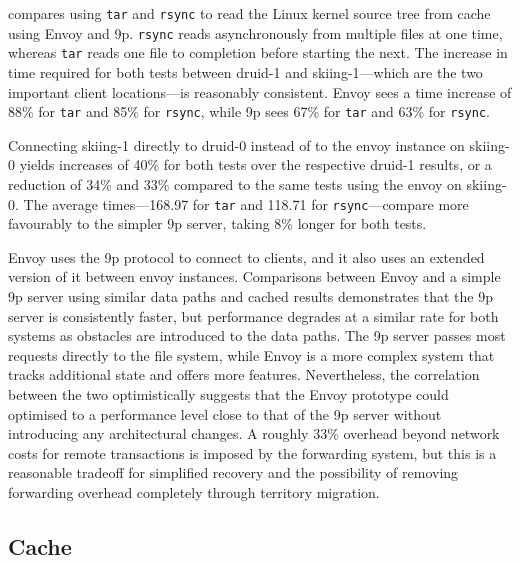  compares using \texttt{tar} and \texttt{rsync} to read the Linux kernel source tree from cache using Envoy and 9p. \texttt{rsync} reads asynchronously from multiple files at one time, whereas \texttt{tar} reads one file to completion before starting the next. The increase in time required for both tests between druid-1 and skiing-1---which are the two important client locations---is reasonably consistent. Envoy sees a time increase of 88\% for \texttt{tar} and 85\% for \texttt{rsync}, while 9p sees 67\% for \texttt{tar} and 63\% for \texttt{rsync}.

Connecting skiing-1 directly to druid-0 instead of to the envoy instance on skiing-0 yields increases of 40\% for both tests over the respective druid-1 results, or a reduction of 34\% and 33\% compared to the same tests using the envoy on skiing-0. The average times---168.97 for \texttt{tar} and 118.71 for \texttt{rsync}---compare more favourably to the simpler 9p server, taking 8\% longer for both tests.

Envoy uses the 9p protocol to connect to clients, and it also uses an extended version of it between envoy instances. Comparisons between Envoy and a simple 9p server using similar data paths and cached results demonstrates that the 9p server is consistently faster, but performance degrades at a similar rate for both systems as obstacles are introduced to the data paths. The 9p server passes most requests directly to the file system, while Envoy is a more complex system that tracks additional state and offers more features. Nevertheless, the correlation between the two optimistically suggests that the Envoy prototype could optimised to a performance level close to that of the 9p server without introducing any architectural changes. A roughly 33\% overhead beyond network costs for remote transactions is imposed by the forwarding system, but this is a reasonable tradeoff for simplified recovery and the possibility of removing forwarding overhead completely through territory migration.

\subsection{Cache}

